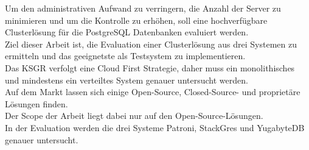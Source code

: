 \documentclass{ksgr_styles}
\begin{document}
\begin{managementsummary}
\begin{flushleft}
            Um den administrativen Aufwand zu verringern, die Anzahl der Server zu minimieren und um die Kontrolle zu erhöhen, soll eine hochverfügbare Clusterlösung für die PostgreSQL Datenbanken evaluiert werden.\\
            Ziel dieser Arbeit ist, die Evaluation einer Clusterlösung aus drei Systemen zu ermitteln und das geeignetste als Testsystem zu implementieren.\\
            Das KSGR verfolgt eine Cloud First Strategie, daher muss ein monolithisches und mindestens ein verteiltes System genauer untersucht werden.\\
            Auf dem Markt lassen sich einige Open-Source, Closed-Source- und proprietäre Lösungen finden.\\
            Der Scope der Arbeit liegt dabei nur auf den Open-Source-Lösungen.\\
            In der Evaluation werden die drei Systeme Patroni, StackGres und YugabyteDB genauer untersucht.
        \end{flushleft}
        \begin{flushleft}

\end{flushleft}
\end{managementsummary}
\end{document}

